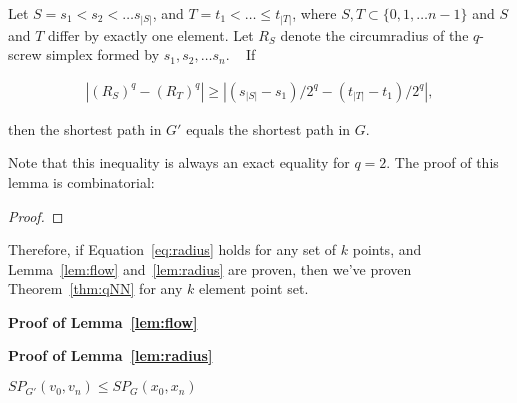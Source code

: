 \begin{lemma}\label{lem:radius} Let $S = s_1 < s_2 < \ldots s_{|S|}$, and $T =
t_1 < \ldots \leq t_{|T|}$, where $S, T \subset \{0,1,\ldots n-1\}$ and $S$ and
$T$ differ by exactly one element. Let $R_S$ denote the circumradius of the
$q$-screw simplex formed by $s_1, s_2, \ldots s_n$. ~ If

\begin{align}\label{eq:radius} |(R_{S})^q-(R_{T})^q| \geq
|(s_{|S|}-s_1)/2^q-(t_{|T|}-t_1)/2^q|, \end{align}

then the shortest path in $G'$ equals the shortest path in $G$.

\end{lemma}

Note that this inequality is always an exact equality for $q=2$. The proof of
this lemma is combinatorial:

\begin{proof}

\end{proof}

Therefore, if Equation~\ref{eq:radius} holds for any set of $k$ points, and
Lemma~\ref{lem:flow} and~\ref{lem:radius} are proven, then we've proven
Theorem~\ref{thm:qNN} for any $k$ element point set.

\textbf{Proof of Lemma~\ref{lem:flow}}

\textbf{Proof of Lemma~\ref{lem:radius}}

\begin{lemma} $SP_{G'}(v_0, v_n) \leq SP_G(x_0, x_n)$

\end{lemma}

